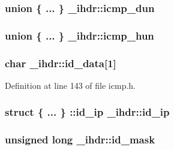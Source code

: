 \hypertarget{struct__ihdr_a80f2308d90fe1041b6305207f7b2352d}{
\subsubsection[{icmp\-\_\-dun}]{\setlength{\rightskip}{0pt plus 5cm}union \{ ... \}   {\bf \-\_\-ihdr\-::icmp\-\_\-dun}}}\label{struct__ihdr_a80f2308d90fe1041b6305207f7b2352d}
\hypertarget{struct__ihdr_abe0a2d0debc1ff2897f3202ef04b9766}{
\subsubsection[{icmp\-\_\-hun}]{\setlength{\rightskip}{0pt plus 5cm}union \{ ... \}   {\bf \-\_\-ihdr\-::icmp\-\_\-hun}}}\label{struct__ihdr_abe0a2d0debc1ff2897f3202ef04b9766}
\hypertarget{struct__ihdr_a8d5a44990de5bfd7c92417f2b3b6c838}{
\subsubsection[{id\-\_\-data}]{\setlength{\rightskip}{0pt plus 5cm}char {\bf \-\_\-ihdr\-::id\-\_\-data}\mbox{[}1\mbox{]}}}\label{struct__ihdr_a8d5a44990de5bfd7c92417f2b3b6c838}


\-Definition at line 143 of file icmp.\-h.

\hypertarget{struct__ihdr_a21dffa6f32fb5b82490caf254fa764c1}{
\subsubsection[{id\-\_\-ip}]{\setlength{\rightskip}{0pt plus 5cm}struct \{ ... \} \-::{\bf id\-\_\-ip}  {\bf \-\_\-ihdr\-::id\-\_\-ip}}}\label{struct__ihdr_a21dffa6f32fb5b82490caf254fa764c1}
\hypertarget{struct__ihdr_a098978c3369610c6662e4c8bcdff9040}{
\subsubsection[{id\-\_\-mask}]{\setlength{\rightskip}{0pt plus 5cm}unsigned long {\bf \-\_\-ihdr\-::id\-\_\-mask}}}\label{struct__ihdr_a098978c3369610c6662e4c8bcdff9040}


